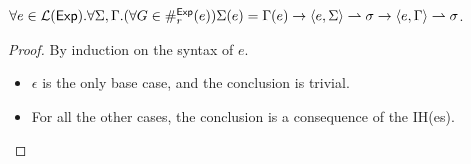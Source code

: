 \begin{lemma}
  \label{lemma:expred}
  $\forall e \in {\mathcal L ({\mathsf{Exp}})}.\forall \Sigma, \Gamma.
  (\forall G \in \#_r^{\mathsf{Exp}}(e)) \Sigma(e)=\Gamma(e)\to
  \langle e, \Sigma\rangle \rightharpoonup \sigma \to \langle e, \Gamma\rangle \rightharpoonup \sigma$.
\end{lemma}
\begin{proof}
  By induction on the syntax of $e$.
  \begin{itemize}
    \item $\epsilon$ is the only base case, and the conclusion is trivial.
    \item For all the other cases, the conclusion is a consequence of the IH(es).
  \end{itemize}
\end{proof}

